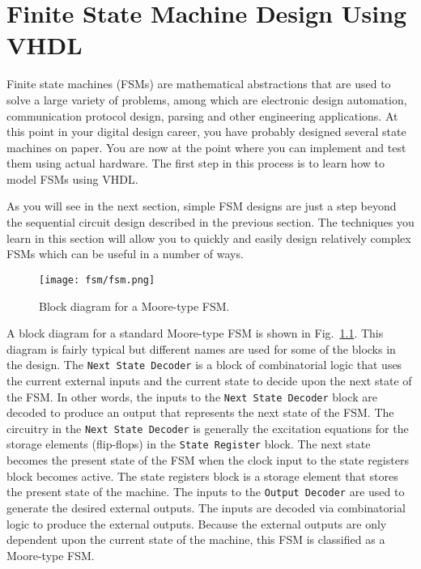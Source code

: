 %
%
\chapter{Finite State Machine Design Using VHDL}
Finite state machines (FSMs) are mathematical abstractions that are used to solve a large variety of problems, among which are electronic design automation, communication protocol design, parsing and other engineering applications. At this point in your digital design career, you have probably designed several state machines on paper. You are now at the point where you can implement and test them using actual hardware. The first step in this process is to learn how to model FSMs using VHDL.

As you will see in the next section, simple FSM designs are just a step beyond the sequential circuit design described in the previous section. The techniques you learn in this section will allow you to quickly and easily design relatively complex FSMs which can be useful in a number of ways.

\begin{figure}
    \centering
	\texttt{[image: fsm/fsm.png]}
	\caption{Block diagram for a Moore-type FSM.}
	\label{fsm}
\end{figure}

A block diagram for a standard Moore-type FSM is shown in Fig.~\ref{fsm}. This diagram is fairly typical but different names are used for some of the blocks in the design. The \texttt{Next State Decoder} is a block of combinatorial logic that uses the current external inputs and the current state to decide upon the next state of the FSM. In other words, the inputs to the \texttt{Next State Decoder} block are decoded to produce an output that represents the next state of the FSM. The circuitry in the \texttt{Next State Decoder} is generally the excitation equations for the storage elements (flip-flops) in the \texttt{State Register} block. The next state becomes the present state of the FSM when the clock input to the state registers block becomes active. The state registers block is a storage element that stores the present state of the machine. The inputs to the \texttt{Output Decoder} are used to generate the desired external outputs. The inputs are decoded via combinatorial logic to produce the external outputs. Because the external outputs are only dependent upon the current state of the machine, this FSM is classified as a Moore-type FSM.

